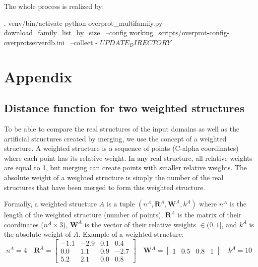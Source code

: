 \documentclass{article}
\begin{document}
The whole process is realized by:

\begin{codeblock}
  . venv/bin/activate
  python  overprot_multifamily.py  --download_family_list_by_size \
      --config working_scripts/overprot-config-overprotserverdb.ini \
      --collect  -  $UPDATE_DIRECTORY                                                           $
\end{codeblock}



\section{Appendix} 
\label{sec:appendix}



\subsection{Distance function for two weighted structures}
\label{sec:appendix_ws_distance}

To be able to compare the real structures of the input domains as well as the artificial 
structures created by merging, we use the concept of a weighted structure. 
A weighted structure is a sequence of points (C-alpha coordinates)
where each point has its relative weight. 
In any real structure, all relative weights are equal to 1, 
but merging can create points with smaller relative weights.
The absolute weight of a weighted structure is simply the number of the real structures 
that have been merged to form this weighted structure.

Formally, a weighted structure \(A\) is a tuple
\( (n^A, \mathbf{R}^A, \mathbf{W}^A, k^A) \) where \(n^A\) is the length
of the weighted structure (number of points), \(\mathbf{R}^A\) is the
matrix of their coordinates (\(n^A \times 3\)), \(\mathbf{W}^A\) is the
vector of their relative weights \(\in (0,1]\), and \(k^A\) is the
absolute weight of \(A\). Example of a weighted structure:
  \[
    n^A = 4 \quad
    \mathbf{R}^A = \begin{bmatrix}-1.1&-2.9&0.1&0.4\\0.0&1.1&0.9&-2.7\\5.2&2.1&0.0&0.8\end{bmatrix} \quad
    \mathbf{W}^A = \begin{bmatrix}1&0.5&0.8&1\end{bmatrix} \quad
    k^A = 10
  \]
\end{document}
